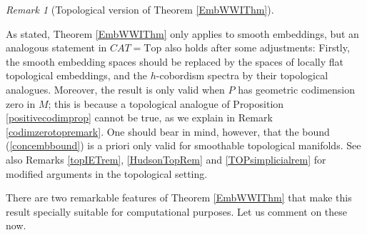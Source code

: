 \documentclass[a4paper, oneside]{amsart}
\newcommand{\1}{\mathds{1}}
\theoremstyle{remark}
\newtheorem{rem}[thm]{Remark}%
\theoremstyle{definition}
\numberwithin{equation}{section}
\begin{document}
\begin{rem}[Topological version of Theorem \ref{EmbWWIThm}]\label{remembWWI}

As stated, Theorem \ref{EmbWWIThm} only applies to smooth embeddings, but an analogous statement in $CAT=\mathrm{Top}$ also holds after some adjustments: Firstly, the smooth embedding spaces should be replaced by the spaces of locally flat topological embeddings, and the $h$-cobordism spectra by their topological analogues. Moreover, the result is only valid when $P$ has geometric codimension zero in $M$; this is because a topological analogue of Proposition \ref{positivecodimprop} cannot be true, as we explain in Remark \ref{codimzerotopremark}. One should bear in mind, however, that the bound (\ref{concembbound}) is a priori only valid for smoothable topological manifolds. See also Remarks \ref{topIETrem}, \ref{HudsonTopRem} and \ref{TOPsimplicialrem} for modified arguments in the topological setting. 
\end{rem}


There are two remarkable features of Theorem \ref{EmbWWIThm} that make this result specially suitable for computational purposes. Let us comment on these now.
\end{document}
